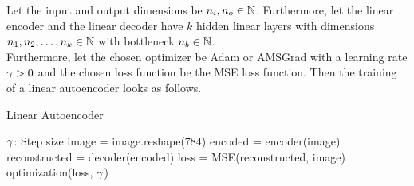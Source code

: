 \begin{algorithm}
Let the input and output dimensions be $n_i, n_o \in\operatorname{\mathbb{N}}$. Furthermore, let the linear encoder and the linear decoder have $k$ hidden linear layers with dimensions $n_1, n_2,\ldots, n_k\in\operatorname{\mathbb{N}}$ with bottleneck $n_b\in\operatorname{\mathbb{N}}$.\\
Furthermore, let the chosen optimizer be Adam or AMSGrad with a learning rate $\operatorname{\gamma}>0$ and the chosen loss function be the MSE loss function. Then the training of a linear autoencoder looks as follows.
\caption{Linear Autoencoder}\label{alg:linear_AE}
\begin{algorithmic}[1]
\Require $\operatorname{\gamma}$: Step size
		\State image = image.reshape(784) 
	    \State encoded = encoder(image) 
		\State reconstructed = decoder(encoded) 
    	\State loss = MSE(reconstructed, image) 
	    \State optimization(loss, $\operatorname{\gamma}$) 
    \EndFor
\EndFor
\end{algorithmic}
\end{algorithm}


